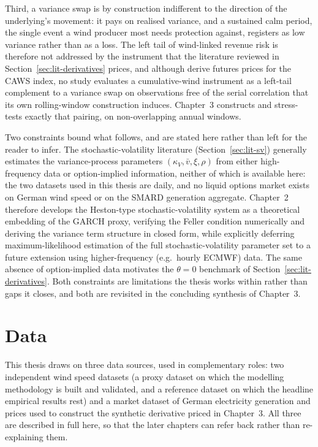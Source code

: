 \documentclass[11pt, a4paper, twoside]{article}
\begin{document}
Third, a variance swap is by construction indifferent to the direction of the underlying's movement: it pays on realised variance, and a sustained calm period, the single event a wind producer most needs protection against, registers as low variance rather than as a loss. The left tail of wind-linked revenue risk is therefore not addressed by the instrument that the literature reviewed in Section~\ref{sec:lit-derivatives} prices, and although \citet{AlexandridisZapranis2013} derive futures prices for the CAWS index, no study evaluates a cumulative-wind instrument as a left-tail complement to a variance swap on observations free of the serial correlation that its own rolling-window construction induces. Chapter~3 constructs and stress-tests exactly that pairing, on non-overlapping annual windows.

Two constraints bound what follows, and are stated here rather than left for the reader to infer. The stochastic-volatility literature (Section~\ref{sec:lit-sv}) generally estimates the variance-process parameters $(\kappa_V, \bar v, \xi, \rho)$ from either high-frequency data or option-implied information, neither of which is available here: the two datasets used in this thesis are daily, and no liquid options market exists on German wind speed or on the SMARD generation aggregate. Chapter~2 therefore develops the Heston-type stochastic-volatility system as a theoretical embedding of the GARCH proxy, verifying the Feller condition numerically and deriving the variance term structure in closed form, while explicitly deferring maximum-likelihood estimation of the full stochastic-volatility parameter set to a future extension using higher-frequency (e.g.\ hourly ECMWF) data. The same absence of option-implied data motivates the $\theta = 0$ benchmark of Section~\ref{sec:lit-derivatives}. Both constraints are limitations the thesis works within rather than gaps it closes, and both are revisited in the concluding synthesis of Chapter~3.

\section{Data}
\label{sec:data}

This thesis draws on three data sources, used in complementary roles: two independent wind speed datasets (a proxy dataset on which the modelling methodology is built and validated, and a reference dataset on which the headline empirical results rest) and a market dataset of German electricity generation and prices used to construct the synthetic derivative priced in Chapter~3. All three are described in full here, so that the later chapters can refer back rather than re-explaining them.
\end{document}
